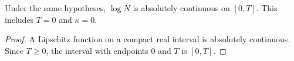 \begin{lemma}
    \label{thm:peps_patch_log_minimum_absolutely_continuous}
    \leanok
    Under the same hypotheses, $\log N$ is absolutely continuous on $[0,T]$.
    This includes $T=0$ and $\kappa=0$.
\end{lemma}
\begin{proof}\leanok
    A Lipschitz function on a compact real interval is absolutely continuous.
    Since $T\ge0$, the interval with endpoints $0$ and $T$ is $[0,T]$.
\end{proof}
